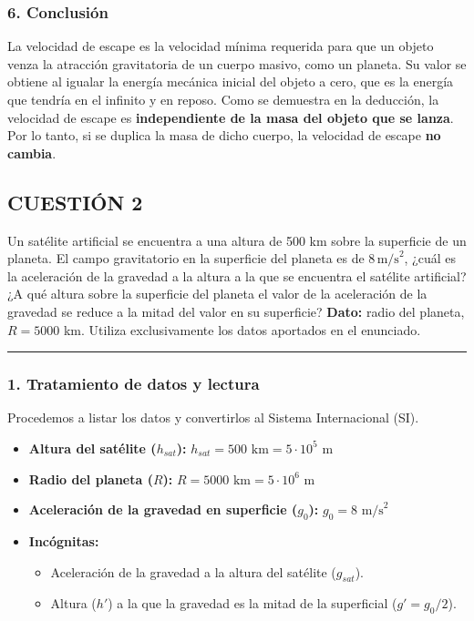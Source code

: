 \subsubsection*{6. Conclusión}
\begin{cajaconclusion}
La velocidad de escape es la velocidad mínima requerida para que un objeto venza la atracción gravitatoria de un cuerpo masivo, como un planeta. Su valor se obtiene al igualar la energía mecánica inicial del objeto a cero, que es la energía que tendría en el infinito y en reposo. Como se demuestra en la deducción, la velocidad de escape es \textbf{independiente de la masa del objeto que se lanza}. Por lo tanto, si se duplica la masa de dicho cuerpo, la velocidad de escape \textbf{no cambia}.
\end{cajaconclusion}

\newpage
\subsection{CUESTIÓN 2}
\label{subsec:C2_2024_jun_ord}

\begin{cajaenunciado}
Un satélite artificial se encuentra a una altura de 500 km sobre la superficie de un planeta. El campo gravitatorio en la superficie del planeta es de $8\,\text{m/s}^2$, ¿cuál es la aceleración de la gravedad a la altura a la que se encuentra el satélite artificial? ¿A qué altura sobre la superficie del planeta el valor de la aceleración de la gravedad se reduce a la mitad del valor en su superficie?
\textbf{Dato:} radio del planeta, $R=5000$ km. Utiliza exclusivamente los datos aportados en el enunciado.
\end{cajaenunciado}
\hrule

\subsubsection*{1. Tratamiento de datos y lectura}
Procedemos a listar los datos y convertirlos al Sistema Internacional (SI).
\begin{itemize}
    \item \textbf{Altura del satélite ($h_{sat}$):} $h_{sat} = 500 \text{ km} = 5 \cdot 10^5 \text{ m}$
    \item \textbf{Radio del planeta ($R$):} $R = 5000 \text{ km} = 5 \cdot 10^6 \text{ m}$
    \item \textbf{Aceleración de la gravedad en superficie ($g_0$):} $g_0 = 8 \text{ m/s}^2$
    \item \textbf{Incógnitas:}
    \begin{itemize}
        \item Aceleración de la gravedad a la altura del satélite ($g_{sat}$).
        \item Altura ($h'$) a la que la gravedad es la mitad de la superficial ($g' = g_0/2$).
    \end{itemize}
\end{itemize}


